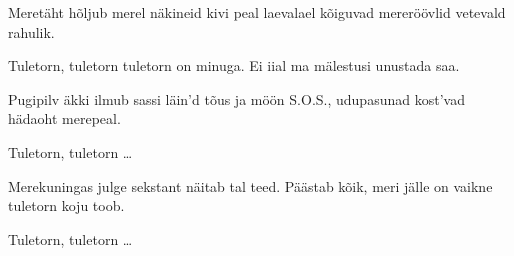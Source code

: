 Meret\"aht h\~oljub merel
n\"akineid kivi peal
laevalael k\~oiguvad merer\"o\"ovlid
vetevald rahulik.

Tuletorn, tuletorn
tuletorn on minuga.
Ei iial ma m\"alestusi 
unustada saa.

Pugipilv \"akki ilmub
sassi l\"ain'd t\~ous ja m\"o\"on
S.O.S., udupasunad kost'vad
h\"adaoht merepeal.

Tuletorn, tuletorn \ldots

Merekuningas julge
sekstant n\"aitab tal teed.
P\"a\"astab k\~oik, meri j\"alle on vaikne
tuletorn koju toob.

Tuletorn, tuletorn \ldots